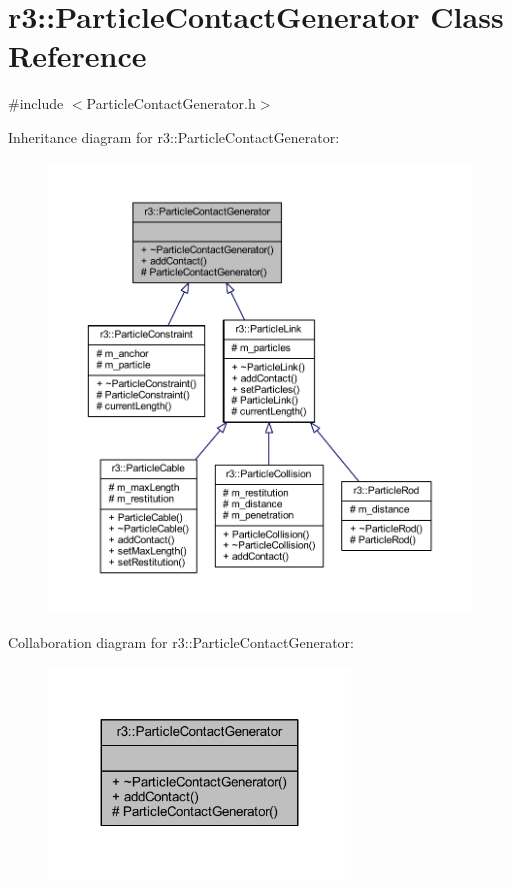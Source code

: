 \hypertarget{classr3_1_1_particle_contact_generator}{}\section{r3\+:\+:Particle\+Contact\+Generator Class Reference}
\label{classr3_1_1_particle_contact_generator}


{\ttfamily \#include $<$Particle\+Contact\+Generator.\+h$>$}



Inheritance diagram for r3\+:\+:Particle\+Contact\+Generator\+:\nopagebreak
\begin{figure}[H]
\begin{center}
\leavevmode
\includegraphics[width=350pt]{classr3_1_1_particle_contact_generator__inherit__graph}
\end{center}
\end{figure}


Collaboration diagram for r3\+:\+:Particle\+Contact\+Generator\+:\nopagebreak
\begin{figure}[H]
\begin{center}
\leavevmode
\includegraphics[width=227pt]{classr3_1_1_particle_contact_generator__coll__graph}
\end{center}
\end{figure}
